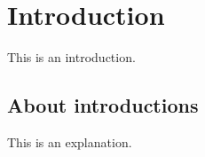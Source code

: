 \chapter{Introduction}\label{introduction}

This is an introduction.

\section{About introductions}

This is an explanation.

\lipsum{}
